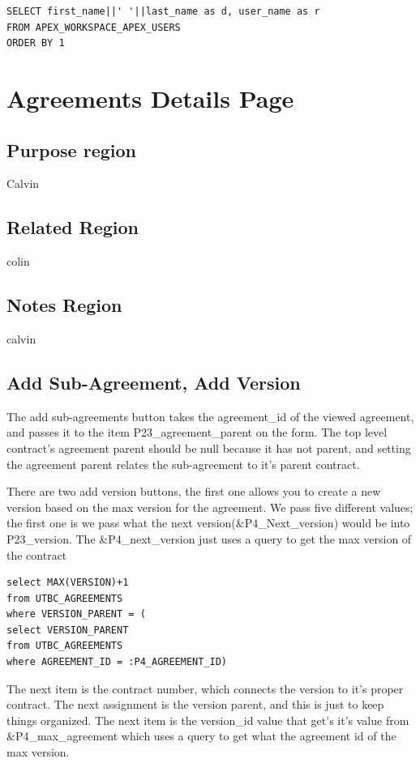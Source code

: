 \documentclass{report}
\begin{document}
\begin{lstlisting}[caption=Reviewed by List of Values]
SELECT first_name||' '||last_name as d, user_name as r
FROM APEX_WORKSPACE_APEX_USERS
ORDER BY 1
\end{lstlisting}


\section{Agreements Details Page}

\subsection{Purpose region}
Calvin

\subsection{Related Region}
colin

\subsection{Notes Region}
calvin

\subsection{Add Sub-Agreement, Add Version}
The add sub-agreements button takes the agreement\_id of the viewed agreement, and passes it to the item P23\_agreement\_parent on the form. The top level contract's agreement parent should be null because it has not parent, and setting the agreement parent relates the sub-agreement to it's parent contract.

There are two add version buttons, the first one allows you to create a new version based on the max version for the agreement. We pass five different values; the first one is we pass what the next version(\&P4\_Next\_version) would be into P23\_version. The \&P4\_next\_version just uses a query to get the max version of the contract

\begin{lstlisting}[caption=P4\_NEXT\_value query]
select MAX(VERSION)+1 
from UTBC_AGREEMENTS 
where VERSION_PARENT = (
select VERSION_PARENT 
from UTBC_AGREEMENTS 
where AGREEMENT_ID = :P4_AGREEMENT_ID)
\end{lstlisting}

The next item is the contract number, which connects the version to it's proper contract. The next assignment is the version parent, and this is just to keep things organized. The next item is the version\_id value that get's it's value from \&P4\_max\_agreement which uses a query to get what the agreement id of the max version. 
\end{document}
